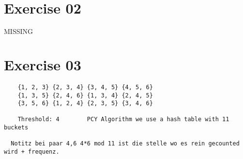 \documentclass[11pt,a4paper]{scrartcl}
\begin{document}
\section*{Exercise 02}
MISSING

\section*{Exercise 03}
	\begin{verbatim}
	{1, 2, 3} {2, 3, 4} {3, 4, 5} {4, 5, 6}
	{1, 3, 5} {2, 4, 6} {1, 3, 4} {2, 4, 5}
	{3, 5, 6} {1, 2, 4} {2, 3, 5} {3, 4, 6}
	
	Threshold: 4		PCY Algorithm we use a hash table with 11 buckets
	
  Notitz bei paar 4,6 4*6 mod 11 ist die stelle wo es rein gecounted wird + frequenz. 
	\end{verbatim}
\end{document}
